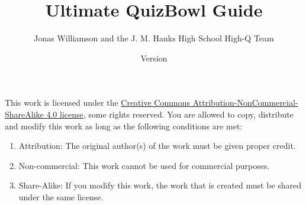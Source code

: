 \documentclass[12pt]{book}
\newcommand{\mytitle}{Ultimate QuizBowl Guide}
\begin{document}
	\frontmatter
	\title{\mytitle}

	
	\author{Jonas Williamson and the  J. M. Hanks High School High-Q Team}
	\date{Version \the\year\the\month\the\day}
	\maketitle
	\begin{center}

			\huge \cc \the\year
			\vspace{0.5 in}
			
			\byncsa
	\normalsize
		\end{center}
		\vspace{2 in}	
	This work is licensed under the \href{https://creativecommons.org/licenses/by-nc-sa/4.0/legalcode}{Creative Commons Attribution-NonCommercial-ShareAlike 4.0 license}, some rights reserved.  You are allowed to copy, distribute and modify this work as long as the following conditions are met:
	\begin{enumerate}
		\item Attribution: The original author(s) of the work must be given proper credit.
		\item Non-commercial: This work cannot be used for commercial purposes.
		\item Share-Alike: If you modify this work, the work that is created must be shared under the same license. 
	\end{enumerate}

\mainmatter


	
	
	
	
	
	
	\tableofcontents
	
	






	
	







	

		
	









		
		
	
		
\end{document}
